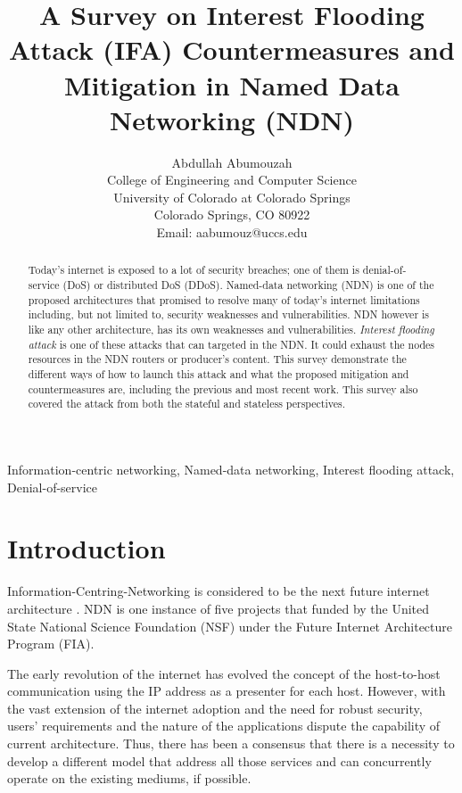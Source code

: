\documentclass[conference]{IEEEtran}
\begin{document}
\title{A Survey on Interest Flooding Attack (IFA) Countermeasures and Mitigation in Named Data Networking (NDN)}

\author{Abdullah Abumouzah\\
College of Engineering and Computer Science\\
University of Colorado at Colorado Springs\\
Colorado Springs, CO 80922\\
Email: aabumouz@uccs.edu}

\maketitle

\begin{abstract}
Today's internet is exposed to a lot of security breaches; one of them is denial-of-service (DoS) or distributed DoS (DDoS). Named-data networking (NDN) is one of the proposed architectures that promised to resolve many of today's internet limitations including, but not limited to, security weaknesses and vulnerabilities. NDN however is like any other architecture, has its own weaknesses and vulnerabilities. \textit{Interest flooding attack} is one of these attacks that can targeted in the NDN. It could exhaust the nodes resources in the NDN routers or producer's content. This survey demonstrate the different ways of how to launch this attack and what the proposed mitigation and countermeasures are, including the previous and most recent work. This survey also covered the attack from both the stateful and stateless perspectives.    

\end{abstract}

\begin{IEEEkeywords}
Information-centric networking, Named-data networking, Interest flooding attack, Denial-of-service
\end{IEEEkeywords}

\section{Introduction}
Information-Centring-Networking is considered to be the next future internet architecture \cite{6231276}. NDN is one instance of five projects that funded by the United State National Science Foundation (NSF) under the Future Internet Architecture Program (FIA).

The early revolution of the internet has evolved the concept of the host-to-host communication using the IP address as a presenter for each host. However, with the vast extension of the internet adoption and the need for robust security, users’ requirements and the nature of the applications dispute the capability of current architecture. Thus, there has been a consensus that there is a necessity to develop a different model that address all those services and can concurrently operate on the existing mediums, if possible.  
\end{document}
